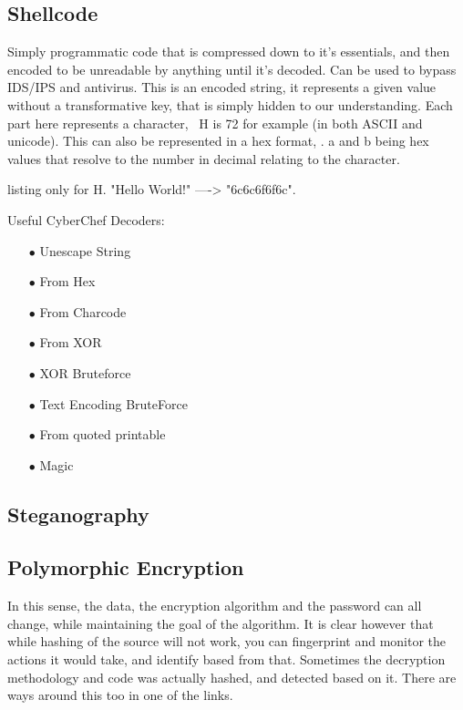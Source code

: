 \subsection{Shellcode}
Simply programmatic code that is compressed down to it's essentials, and then encoded to be unreadable by anything until it's decoded. 
Can be used to bypass IDS/IPS and antivirus. This is an encoded string, it represents a given value without a transformative key, 
that is simply hidden to our understanding. Each part here represents a character,  H is 72 for example (in both ASCII and unicode). 
This can also be represented in a hex format, \xab. 
a and b being hex values that resolve to the number in decimal relating to the character. 
\begin{tcblisting}{listing only}
 for H. "Hello World!" ----> "\x6c\x6c\x6f\x6f\x6c". 
\end{tcblisting}

Useful CyberChef Decoders:
\begin{enumerate}
    \item [$\bullet$] Unescape String
    \item [$\bullet$] From Hex
    \item [$\bullet$] From Charcode
    \item [$\bullet$] From XOR
    \item [$\bullet$] XOR Bruteforce
    \item [$\bullet$] Text Encoding BruteForce
    \item [$\bullet$] From quoted printable
    \item [$\bullet$] Magic
\end{enumerate}

\subsection{Steganography}

\subsection{Polymorphic Encryption}
In this sense, the data, the encryption algorithm and the password can all change, while maintaining the goal of the algorithm.
It is clear however that while hashing of the source will not work, you can fingerprint and monitor the actions it would take, and identify based from that.
Sometimes the decryption methodology and code was actually hashed, and detected based on it. There are ways around this too in one of the links.

